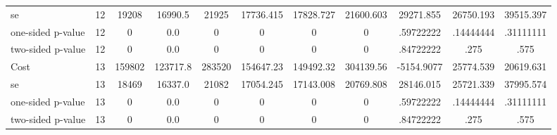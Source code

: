 \begin{tabular}{lcccccccccc}
se 				 &        12 &     19208 &   16990.5 &     21925 & 17736.415 & 17828.727 & 21600.603 & 29271.855 & 26750.193 & 39515.397 \\  
one-sided p-value&        12 &         0 &       0.0 &         0 & 0 & 0 & 0 & .59722222 & .14444444 & .31111111 \\  
two-sided p-value&        12 &         0 &       0.0 &         0 & 0 & 0 & 0 & .84722222 & .275 & .575 \\  
Cost 			  &        13 &    159802 &  123717.8 &    283520 & 154647.23 & 149492.32 & 304139.56 & -5154.9077 & 25774.539 & 20619.631 \\  
se 				 &        13 &     18469 &   16337.0 &     21082 & 17054.245 & 17143.008 & 20769.808 & 28146.015 & 25721.339 & 37995.574 \\  
one-sided p-value&        13 &         0 &       0.0 &         0 & 0 & 0 & 0 & .59722222 & .14444444 & .31111111 \\  
two-sided p-value&        13 &         0 &       0.0 &         0 & 0 & 0 & 0 & .84722222 & .275 & .575 \\   
\hline \hline \end{tabular}

